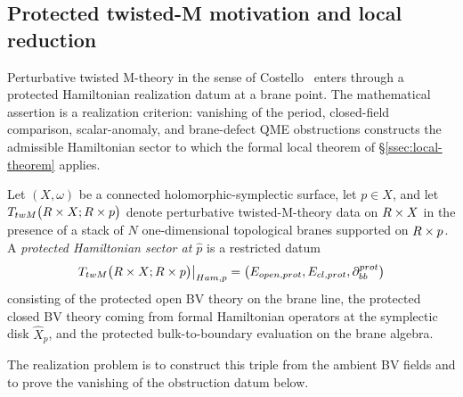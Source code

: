 %

\subsection{Protected twisted-M motivation and local reduction}\label{ssec:twistedM-universality}

Perturbative twisted M-theory in the sense of
Costello~\cite{costello-twistedM} enters through a protected
Hamiltonian realization datum at a brane point.  The mathematical
assertion is a realization criterion: vanishing of the period,
closed-field comparison, scalar-anomaly, and brane-defect QME
obstructions constructs the admissible Hamiltonian sector to which the
formal local theorem of \S\ref{ssec:local-theorem} applies.

\begin{defn}
  Let $(X,\omega)$ be a connected holomorphic-symplectic surface, let
  $p\in X$, and let
  $T_{twM}\bigl(R\times X;R\times p\bigr)$ denote
  perturbative twisted-M-theory data on $R\times X$ in the presence
  of a stack of $N$ one-dimensional topological branes supported on
  $R\times p$.  A \emph{protected Hamiltonian sector at $\widehat p$}
  is a restricted datum
  $$
  T_{twM}\bigl(R\times X;R\times p\bigr)
    \big|_{Ham,p}
    =
    \bigl(
      E_{open,prot},
      E_{cl,prot},
      \partial_{bb}^{prot}
    \bigr)
  $$
  consisting of the protected open BV theory on the brane line, the
  protected closed BV theory coming from formal Hamiltonian operators
  at the symplectic disk $\widehat X_p$, and the protected
  bulk-to-boundary evaluation on the brane algebra.

  The realization problem is to construct this triple from the ambient
  BV fields and to prove the vanishing of the obstruction datum below.
\end{defn}

